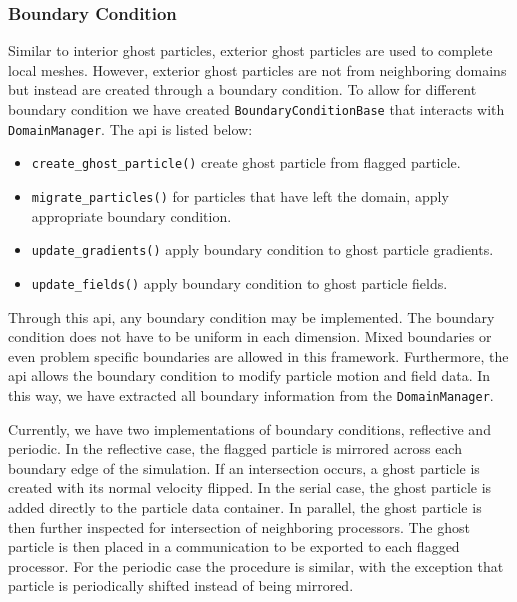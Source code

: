 \subsubsection{Boundary Condition}
Similar to interior ghost particles, exterior ghost particles are used to
complete local meshes. However, exterior ghost particles are not from neighboring
domains but instead are created through a boundary condition. To allow for different
boundary condition we have created \lstinline{BoundaryConditionBase} that interacts
with \lstinline{DomainManager}. The api is listed below:
\begin{itemize}
	\item \lstinline{create_ghost_particle()} create ghost particle from flagged particle.
    \item \lstinline{migrate_particles()} for particles that have left the domain, apply
    appropriate boundary condition.
    \item \lstinline{update_gradients()} apply boundary condition to ghost particle gradients.
    \item \lstinline{update_fields()} apply boundary condition to ghost particle fields.
\end{itemize}
Through this api, any boundary condition may be implemented. The boundary condition does not have
to be uniform in each dimension. Mixed boundaries or even problem specific boundaries are allowed
in this framework. Furthermore, the api allows the boundary
condition to modify particle motion and field data. In this way, we have extracted all boundary
information from the \lstinline{DomainManager}.

Currently, we have two implementations of boundary conditions, reflective and periodic.
In the reflective case, the flagged particle is mirrored across each boundary edge of the
simulation. If an intersection occurs, a ghost particle is created with its normal velocity flipped.
In the serial case, the ghost particle is added directly to the particle data container. In parallel, the 
ghost particle is then further inspected for intersection of neighboring processors. The ghost particle
is then placed in a communication to be exported to each flagged processor. For the periodic case
the procedure is similar, with the exception that particle is periodically shifted
instead of being mirrored.

